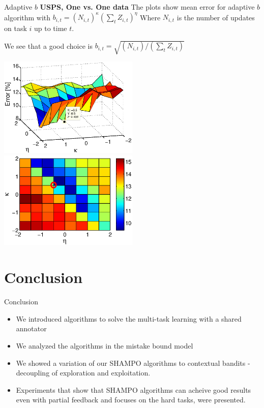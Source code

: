 \documentclass{beamer}
\begin{document}
\begin{frame}{Adaptive $b$}
\textbf{USPS, One vs. One data} \newline
The plots show mean error for adaptive $b$ algorithm with $b_{i,t}= (N_{i,t})^{\kappa}(\sum_t{Z_{i,t}})^{\eta}$\newline
Where $N_{i,t}$ is the number of updates on task $i$ up to time $t$.\newline

We see that a good choice is  $b_{i,t}=\sqrt{(N_{i,t})/(\sum_t{Z_{i,t}})}$\newline

\begin{centering}
\includegraphics[width=0.5\textwidth]{figs/Mean_test_error_adaptive_b_V2_3D.eps}
\includegraphics[width=0.5\textwidth]{figs/Mean_test_error_adaptive_b_V2_2D.eps}
\end{centering}
\end{frame}

\section{Conclusion}

\begin{frame}{Conclusion}
\begin{itemize}
\item We introduced algorithms to solve the multi-task learning with a shared annotator\newline
\item We analyzed the algorithms in the mistake bound model  \newline
\item We showed a variation of our SHAMPO algorithms to contextual bandits - decoupling of exploration and exploitation.\newline
\item Experiments that show that SHAMPO algorithms can acheive good results even with partial feedback and focuses on the hard tasks, were presented. \newline
\end{itemize}
\end{frame}
\end{document}
